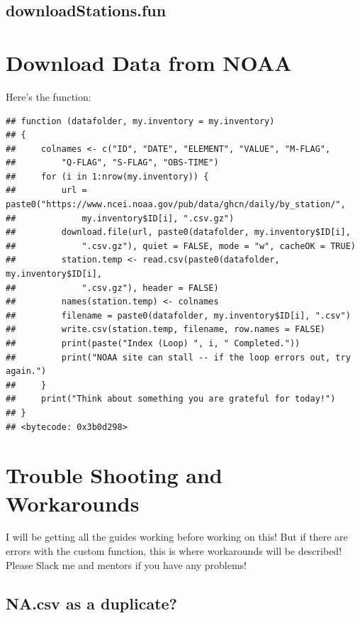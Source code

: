 \documentclass{article}\usepackage[]{graphicx}\usepackage[dvipsnames]{xcolor}
\makeatletter
\newenvironment{kframe}{%
 \def\at@end@of@kframe{}%
 \ifinner\ifhmode%
  \def\at@end@of@kframe{\end{minipage}}%
  \begin{minipage}{\columnwidth}%
 \fi\fi%
 \def\FrameCommand##1{\hskip\@totalleftmargin \hskip-\fboxsep
 \colorbox{shadecolor}{##1}\hskip-\fboxsep
     \hskip-\linewidth \hskip-\@totalleftmargin \hskip\columnwidth}%
 \MakeFramed {\advance\hsize-\width
   \@totalleftmargin\z@ \linewidth\hsize
   \@setminipage}}%
 {\par\unskip\endMakeFramed%
 \at@end@of@kframe}
\newenvironment{knitrout}{}{} %
\makeatother
\begin{document}
\subsection{downloadStations.fun}\label{subsec:downloadStations}\section{Download Data from NOAA}





Here's the function:

\begin{knitrout}
\color{fgcolor}\begin{kframe}
\begin{verbatim}
## function (datafolder, my.inventory = my.inventory) 
## {
##     colnames <- c("ID", "DATE", "ELEMENT", "VALUE", "M-FLAG", 
##         "Q-FLAG", "S-FLAG", "OBS-TIME")
##     for (i in 1:nrow(my.inventory)) {
##         url = paste0("https://www.ncei.noaa.gov/pub/data/ghcn/daily/by_station/", 
##             my.inventory$ID[i], ".csv.gz")
##         download.file(url, paste0(datafolder, my.inventory$ID[i], 
##             ".csv.gz"), quiet = FALSE, mode = "w", cacheOK = TRUE)
##         station.temp <- read.csv(paste0(datafolder, my.inventory$ID[i], 
##             ".csv.gz"), header = FALSE)
##         names(station.temp) <- colnames
##         filename = paste0(datafolder, my.inventory$ID[i], ".csv")
##         write.csv(station.temp, filename, row.names = FALSE)
##         print(paste("Index (Loop) ", i, " Completed."))
##         print("NOAA site can stall -- if the loop errors out, try again.")
##     }
##     print("Think about something you are grateful for today!")
## }
## <bytecode: 0x3b0d298>
\end{verbatim}
\end{kframe}
\end{knitrout}

\section{Trouble Shooting and Workarounds}

I will be getting all the guides working before working on this! But if there are errors with the custom function, this is where workarounds will be described! Please Slack me and mentors if you have any problems!

\subsection{NA.csv as a duplicate?}
\end{document}
